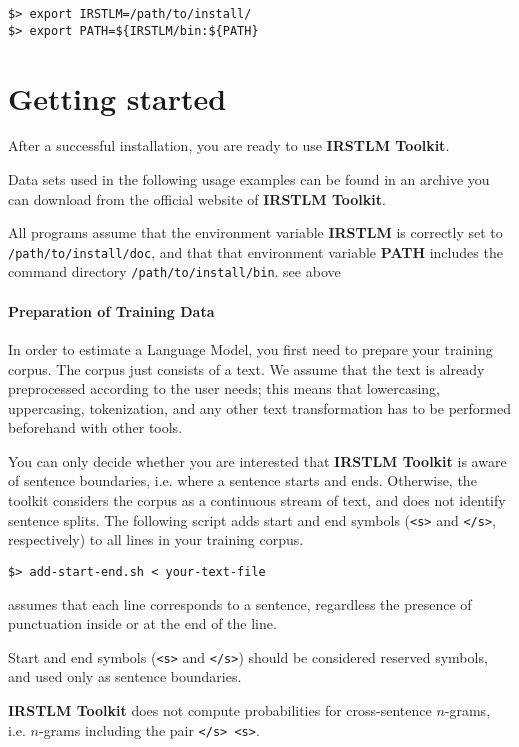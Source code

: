 \documentclass[11pt]{article}
\newcommand{\IRSTLM}{{\bf IRSTLM Toolkit}}
\newcommand{\IMPORTANT}[1]{\begin{mdframed}[linecolor=red]\noindent #1\end{mdframed}}
\begin{document}
\begin{verbatim}
$> export IRSTLM=/path/to/install/
$> export PATH=${IRSTLM/bin:${PATH}
\end{verbatim}

\newpage
\section{Getting started}
After a successful installation, you are ready to use {\IRSTLM}.

\noindent
Data sets used in the following usage examples can be found in an archive you can download from the official website of {\IRSTLM}.


\IMPORTANT{All programs assume that the environment variable {\bf IRSTLM} is correctly set to {\tt /path/to/install/doc}, and that that environment variable {\bf PATH} includes the command directory {\tt /path/to/install/bin}. see above}


\paragraph{Preparation of Training Data}
In order to estimate a Language Model, you first need to prepare your training corpus. The corpus just consists of a text.
We assume that the text is already preprocessed according to the user needs; this means that lowercasing, uppercasing, tokenization, and any other text transformation has to be performed beforehand with other tools.

\noindent
You can only decide whether you are interested that {\IRSTLM} is aware
of sentence boundaries, i.e. where a sentence starts and ends. Otherwise,
the toolkit considers the corpus as a continuous stream of text, and does
not identify sentence splits.  The following script adds start and end
symbols ({\tt <s>} and {\tt </s>}, respectively) to all lines in your training corpus.
\begin{verbatim}
$> add-start-end.sh < your-text-file 
\end{verbatim}

\IMPORTANT{{\IRSTLM} assumes that each line corresponds to a sentence, regardless the presence of punctuation inside or at the end of the line.}
\IMPORTANT{Start and end symbols ({\tt <s>} and {\tt </s>}) should be considered reserved symbols, and used only as sentence boundaries.}

\noindent
{\IRSTLM} does not compute probabilities for cross-sentence $n$-grams, i.e. $n$-grams including the pair {\tt </s>  <s>}.
\end{document}
